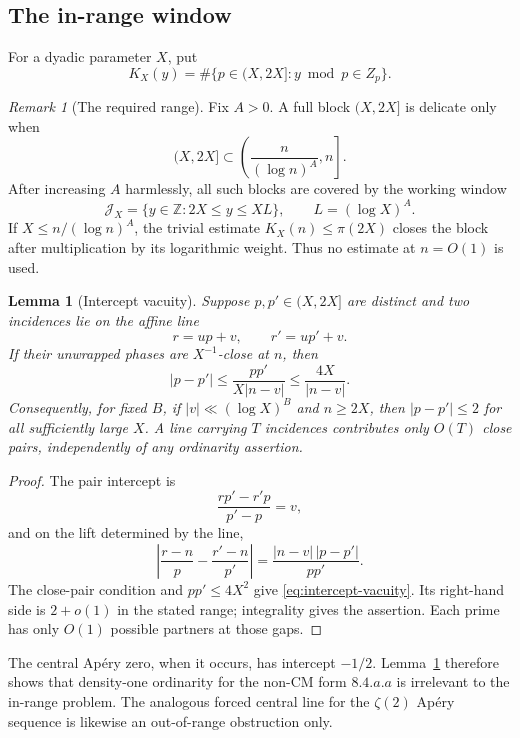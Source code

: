 \documentclass[11pt]{amsart}
\newcommand{\Z}{\mathbb{Z}}
\theoremstyle{plain}
\newtheorem{lemma}{Lemma}
\theoremstyle{remark}
\newtheorem{remark}{Remark}
\begin{document}
\subsection{The in-range window}

For a dyadic parameter $X$, put
\[
 K_X(y)=\#\{p\in(X,2X]:y\bmod p\in Z_p\}.
\]

\begin{remark}[The required range]\label{rem:required-range}
Fix $A>0$.  A full block $(X,2X]$ is delicate only when
\[
 (X,2X]\subset\left(\frac{n}{(\log n)^A},n\right].
\]
After increasing $A$ harmlessly, all such blocks are covered by the
working window
\[
 \mathcal J_X=\{y\in\Z:2X\leq y\leq X L\},
 \qquad L=(\log X)^A.
 \tag{6.1}\label{eq:in-range-window}
\]
If $X\leq n/(\log n)^A$, the trivial estimate
$K_X(n)\leq\pi(2X)$ closes the block after multiplication by its
logarithmic weight.  Thus no estimate at $n=O(1)$ is used.
\end{remark}

\begin{lemma}[Intercept vacuity]\label{lem:intercept-vacuity}
Suppose $p,p'\in(X,2X]$ are distinct and two incidences lie on the
affine line
\[
 r=up+v,\qquad r'=up'+v.
\]
If their unwrapped phases are $X^{-1}$-close at $n$, then
\[
 |p-p'|\leq\frac{pp'}{X|n-v|}
 \leq\frac{4X}{|n-v|}.
 \tag{6.2}\label{eq:intercept-vacuity}
\]
Consequently, for fixed $B$, if $|v|\ll(\log X)^B$ and $n\geq2X$,
then $|p-p'|\leq2$ for all sufficiently large $X$.  A line carrying
$T$ incidences contributes only $O(T)$ close pairs, independently of
any ordinarity assertion.
\end{lemma}

\begin{proof}
The pair intercept is
\[
 \frac{rp'-r'p}{p'-p}=v,
\]
and on the lift determined by the line,
\[
 \left|\frac{r-n}{p}-\frac{r'-n}{p'}\right|
 =\frac{|n-v|\,|p-p'|}{pp'}.
\]
The close-pair condition and $pp'\leq4X^2$ give
\eqref{eq:intercept-vacuity}.  Its right-hand side is $2+o(1)$ in the
stated range; integrality gives the assertion.  Each prime has only
$O(1)$ possible partners at those gaps.
\end{proof}

The central Ap\'ery zero, when it occurs, has intercept $-1/2$.
Lemma~\ref{lem:intercept-vacuity} therefore shows that density-one
ordinarity for the non-CM form $8.4.a.a$ is irrelevant to the in-range
problem.  The analogous forced central line for the $\zeta(2)$ Ap\'ery
sequence is likewise an out-of-range obstruction only.
\end{document}
